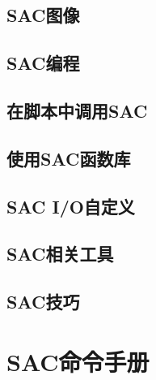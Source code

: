 \documentclass[a4paper, 11pt, twoside]{book}
\begin{document}
\chapter{SAC图像}
\label{chap:sac-graphics}








\chapter{SAC编程}
\label{chap:sac-programming}






\chapter{在脚本中调用SAC}
\label{chap:sac-script}




\chapter{使用SAC函数库}
\label{chap:sac-libs}





\chapter{SAC I/O自定义}
\label{chap:sac-custom-io}


\chapter{SAC相关工具}






\chapter{SAC技巧}


\part{SAC命令手册}
\end{document}
